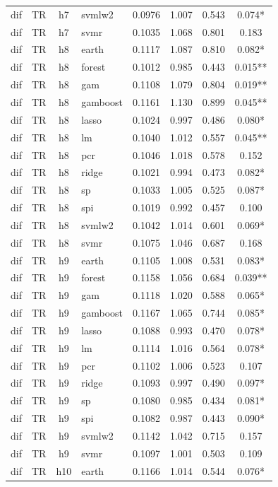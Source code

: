 \begin{ThreePartTable}
\begin{longtable}[t]{llclcccc}
dif & TR & h7 & svmlw2 & 0.0976 & 1.007 & 0.543 & 0.074*\\
dif & TR & h7 & svmr & 0.1035 & 1.068 & 0.801 & 0.183\\
\addlinespace
dif & TR & h8 & earth & 0.1117 & 1.087 & 0.810 & 0.082*\\
dif & TR & h8 & forest & 0.1012 & 0.985 & 0.443 & 0.015**\\
dif & TR & h8 & gam & 0.1108 & 1.079 & 0.804 & 0.019**\\
dif & TR & h8 & gamboost & 0.1161 & 1.130 & 0.899 & 0.045**\\
dif & TR & h8 & lasso & 0.1024 & 0.997 & 0.486 & 0.080*\\
dif & TR & h8 & lm & 0.1040 & 1.012 & 0.557 & 0.045**\\
dif & TR & h8 & pcr & 0.1046 & 1.018 & 0.578 & 0.152\\
dif & TR & h8 & ridge & 0.1021 & 0.994 & 0.473 & 0.082*\\
dif & TR & h8 & sp & 0.1033 & 1.005 & 0.525 & 0.087*\\
dif & TR & h8 & spi & 0.1019 & 0.992 & 0.457 & 0.100\\
dif & TR & h8 & svmlw2 & 0.1042 & 1.014 & 0.601 & 0.069*\\
dif & TR & h8 & svmr & 0.1075 & 1.046 & 0.687 & 0.168\\
\addlinespace
dif & TR & h9 & earth & 0.1105 & 1.008 & 0.531 & 0.083*\\
dif & TR & h9 & forest & 0.1158 & 1.056 & 0.684 & 0.039**\\
dif & TR & h9 & gam & 0.1118 & 1.020 & 0.588 & 0.065*\\
dif & TR & h9 & gamboost & 0.1167 & 1.065 & 0.744 & 0.085*\\
dif & TR & h9 & lasso & 0.1088 & 0.993 & 0.470 & 0.078*\\
dif & TR & h9 & lm & 0.1114 & 1.016 & 0.564 & 0.078*\\
dif & TR & h9 & pcr & 0.1102 & 1.006 & 0.523 & 0.107\\
dif & TR & h9 & ridge & 0.1093 & 0.997 & 0.490 & 0.097*\\
dif & TR & h9 & sp & 0.1080 & 0.985 & 0.434 & 0.081*\\
dif & TR & h9 & spi & 0.1082 & 0.987 & 0.443 & 0.090*\\
dif & TR & h9 & svmlw2 & 0.1142 & 1.042 & 0.715 & 0.157\\
dif & TR & h9 & svmr & 0.1097 & 1.001 & 0.503 & 0.109\\
\addlinespace
dif & TR & h10 & earth & 0.1166 & 1.014 & 0.544 & 0.076*\\

\end{longtable}
\end{ThreePartTable}
